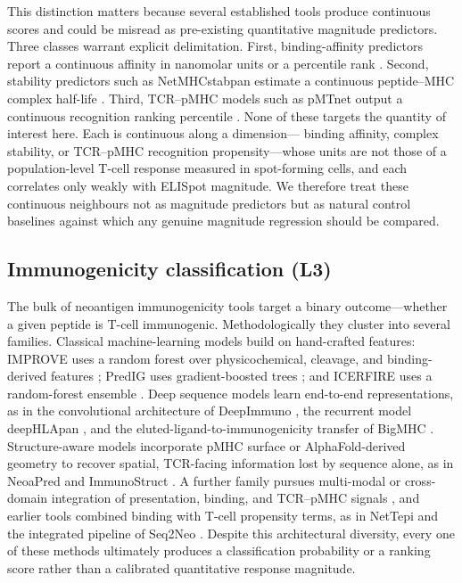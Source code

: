 This distinction matters because several established tools produce continuous
scores and could be misread as pre-existing quantitative magnitude predictors.
Three classes warrant explicit delimitation. First, binding-affinity predictors
report a continuous affinity in nanomolar units or a percentile rank
\cite{NetMHCpan2020,MHCflurry2020}. Second, stability predictors such as
NetMHCstabpan estimate a continuous peptide--MHC complex half-life
\cite{NetMHCstabpan2016}. Third, TCR--pMHC models such as pMTnet output a
continuous recognition ranking percentile \cite{pMTnet2021}. None of these
targets the quantity of interest here. Each is continuous along a dimension---
binding affinity, complex stability, or TCR--pMHC recognition propensity---whose
units are not those of a population-level T-cell response measured in
spot-forming cells, and each correlates only weakly with ELISpot magnitude. We
therefore treat these continuous neighbours not as magnitude predictors but as
natural control baselines against which any genuine magnitude regression should
be compared.

\subsection{Immunogenicity classification (L3)}
\label{sec:related:immuno}

The bulk of neoantigen immunogenicity tools target a binary outcome---whether a
given peptide is T-cell immunogenic. Methodologically they cluster into several
families. Classical machine-learning models build on hand-crafted features:
IMPROVE uses a random forest over physicochemical, cleavage, and binding-derived
features \cite{IMPROVE2024}; PredIG uses gradient-boosted trees \cite{PredIG2025};
and ICERFIRE uses a random-forest ensemble \cite{ICERFIRE2024}. Deep
sequence models learn end-to-end representations, as in the convolutional
architecture of DeepImmuno \cite{DeepImmuno2021}, the recurrent model deepHLApan
\cite{deepHLApan2019}, and the eluted-ligand-to-immunogenicity transfer of BigMHC
\cite{BigMHC2023}. Structure-aware models incorporate pMHC surface or
AlphaFold-derived geometry to recover spatial, TCR-facing information lost by
sequence alone, as in NeoaPred \cite{NeoaPred2024} and ImmunoStruct
\cite{ImmunoStruct2025}. A further family pursues multi-modal or cross-domain
integration of presentation, binding, and TCR--pMHC signals \cite{TSCAPE2025},
and earlier tools combined binding with T-cell propensity terms, as in NetTepi
\cite{NetTepi2014} and the integrated pipeline of Seq2Neo \cite{Seq2Neo2022}.
Despite this architectural diversity, every one of these methods ultimately
produces a classification probability or a ranking score rather than a calibrated
quantitative response magnitude.

